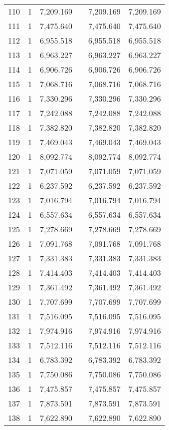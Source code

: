 \begin{table}[!htbp]
\begin{tabular}{@{\extracolsep{5pt}}lccccc}
110 & 1 & 7,209.169 &  & 7,209.169 & 7,209.169 \\ 
111 & 1 & 7,475.640 &  & 7,475.640 & 7,475.640 \\ 
112 & 1 & 6,955.518 &  & 6,955.518 & 6,955.518 \\ 
113 & 1 & 6,963.227 &  & 6,963.227 & 6,963.227 \\ 
114 & 1 & 6,906.726 &  & 6,906.726 & 6,906.726 \\ 
115 & 1 & 7,068.716 &  & 7,068.716 & 7,068.716 \\ 
116 & 1 & 7,330.296 &  & 7,330.296 & 7,330.296 \\ 
117 & 1 & 7,242.088 &  & 7,242.088 & 7,242.088 \\ 
118 & 1 & 7,382.820 &  & 7,382.820 & 7,382.820 \\ 
119 & 1 & 7,469.043 &  & 7,469.043 & 7,469.043 \\ 
120 & 1 & 8,092.774 &  & 8,092.774 & 8,092.774 \\ 
121 & 1 & 7,071.059 &  & 7,071.059 & 7,071.059 \\ 
122 & 1 & 6,237.592 &  & 6,237.592 & 6,237.592 \\ 
123 & 1 & 7,016.794 &  & 7,016.794 & 7,016.794 \\ 
124 & 1 & 6,557.634 &  & 6,557.634 & 6,557.634 \\ 
125 & 1 & 7,278.669 &  & 7,278.669 & 7,278.669 \\ 
126 & 1 & 7,091.768 &  & 7,091.768 & 7,091.768 \\ 
127 & 1 & 7,331.383 &  & 7,331.383 & 7,331.383 \\ 
128 & 1 & 7,414.403 &  & 7,414.403 & 7,414.403 \\ 
129 & 1 & 7,361.492 &  & 7,361.492 & 7,361.492 \\ 
130 & 1 & 7,707.699 &  & 7,707.699 & 7,707.699 \\ 
131 & 1 & 7,516.095 &  & 7,516.095 & 7,516.095 \\ 
132 & 1 & 7,974.916 &  & 7,974.916 & 7,974.916 \\ 
133 & 1 & 7,512.116 &  & 7,512.116 & 7,512.116 \\ 
134 & 1 & 6,783.392 &  & 6,783.392 & 6,783.392 \\ 
135 & 1 & 7,750.086 &  & 7,750.086 & 7,750.086 \\ 
136 & 1 & 7,475.857 &  & 7,475.857 & 7,475.857 \\ 
137 & 1 & 7,873.591 &  & 7,873.591 & 7,873.591 \\ 
138 & 1 & 7,622.890 &  & 7,622.890 & 7,622.890 \\ 

\end{tabular}
\end{table}
